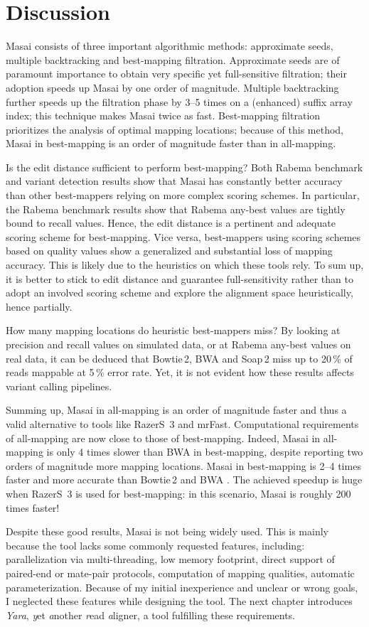 \section{Discussion}

Masai consists of three important algorithmic methods: approximate seeds, multiple backtracking and best-mapping filtration.
Approximate seeds are of paramount importance to obtain very specific yet full-sensitive filtration; their adoption speeds up Masai by one order of magnitude.
Multiple backtracking further speeds up the filtration phase by 3--5 times on a (enhanced) suffix array index; this technique makes Masai twice as fast.
Best-mapping filtration prioritizes the analysis of optimal mapping locations; because of this method, Masai in best-mapping is an order of magnitude faster than in all-mapping.

Is the edit distance sufficient to perform best-mapping?
Both Rabema benchmark and variant detection results show that Masai has constantly better accuracy than other best-mappers relying on more complex scoring schemes.
In particular, the Rabema benchmark results show that Rabema any-best values are tightly bound to recall values.
Hence, the edit distance is a pertinent and adequate scoring scheme for best-mapping.
Vice versa, best-mappers using scoring schemes based on quality values show a generalized and substantial loss of mapping accuracy.
This is likely due to the heuristics on which these tools rely.
To sum up, it is better to stick to edit distance and guarantee full-sensitivity rather than to adopt an involved scoring scheme and explore the alignment space heuristically, hence partially.

How many mapping locations do heuristic best-mappers miss?
By looking at precision and recall values on simulated data, or at Rabema any-best values on real data, it can be deduced that Bowtie\,2, BWA and Soap\,2 miss up to 20\,\% of reads mappable at 5\,\% error rate.
Yet, it is not evident how these results affects variant calling pipelines.

Summing up, Masai in all-mapping is an order of magnitude faster and thus a valid alternative to tools like RazerS~3 and mrFast.
Computational requirements of all-mapping are now close to those of best-mapping.
Indeed, Masai in all-mapping is only 4 times slower than BWA in best-mapping, despite reporting two orders of magnitude more mapping locations.
Masai in best-mapping is 2--4 times faster and more accurate than Bowtie\,2 \citep{Langmead2012} and BWA \citep{Li2009}.
The achieved speedup is huge when RazerS~3 is used for best-mapping: in this scenario, Masai is roughly 200 times faster!

Despite these good results, Masai is not being widely used.
This is mainly because the tool lacks some commonly requested features, including:
parallelization via multi-threading, low memory footprint, direct support of paired-end or mate-pair protocols, computation of mapping qualities, automatic parameterization.
Because of my initial inexperience and unclear or wrong goals, I neglected these features while designing the tool.
The next chapter introduces \emph{Yara}, \emph{y}et \emph{a}nother \emph{r}ead \emph{a}ligner, a tool fulfilling these requirements.
